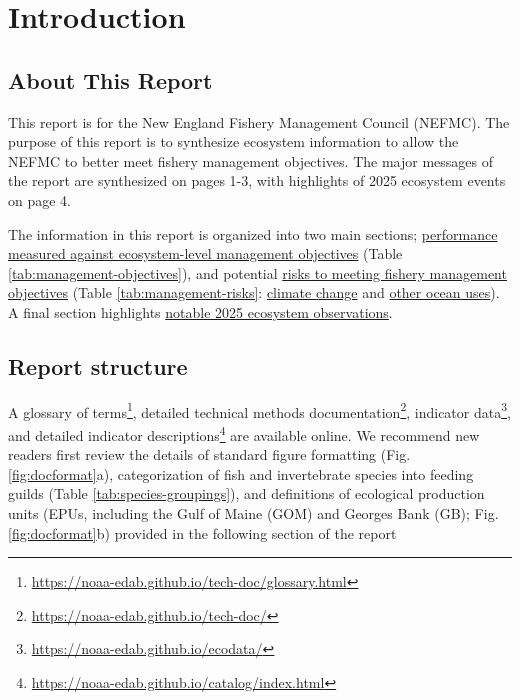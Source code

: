 \documentclass[
  10pt,
]{article}
\author{}
\date{\vspace{-2.5em}}
\begin{document}
\setcounter{page}{5}

\thispagestyle{fancy}

\section{Introduction}\label{introduction}

\subsection{About This Report}\label{about-this-report}

This report is for the New England Fishery Management Council (NEFMC). The purpose of this report is to synthesize ecosystem information to allow the NEFMC to better meet fishery management objectives. The major messages of the report are synthesized on pages 1-3, with highlights of 2025 ecosystem events on page 4.

The information in this report is organized into two main sections; \hyperref[performance-relative-to-fishery-management-objectives]{performance measured against ecosystem-level management objectives} (Table \ref{tab:management-objectives}), and potential \hyperref[risks-to-meeting-fishery-management-objectives]{risks to meeting fishery management objectives} (Table \ref{tab:management-risks}: \hyperref[climate-and-ecosystem-change]{climate change} and \hyperref[other-ocean-uses-offshore-wind]{other ocean uses}). A final section highlights \hyperref[highlights]{notable 2025 ecosystem observations}.

\subsection{Report structure}\label{report-structure}

A glossary of terms\footnote{\url{https://noaa-edab.github.io/tech-doc/glossary.html}}, detailed technical methods documentation\footnote{\url{https://noaa-edab.github.io/tech-doc/}}, indicator data\footnote{\url{https://noaa-edab.github.io/ecodata/}}, and detailed indicator descriptions\footnote{\url{https://noaa-edab.github.io/catalog/index.html}} are available online. We recommend new readers first review the details of standard figure formatting (Fig. \ref{fig:docformat}a), categorization of fish and invertebrate species into feeding guilds (Table \ref{tab:species-groupings}), and definitions of ecological production units (EPUs, including the Gulf of Maine (GOM) and Georges Bank (GB); Fig. \ref{fig:docformat}b) provided in the following section of the report
\end{document}
